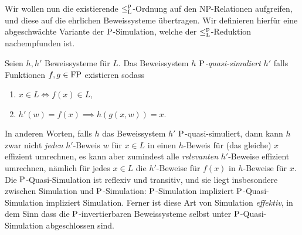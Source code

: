 Wir wollen nun die existierende $\leqlp$-Ordnung auf den NP-Relationen aufgreifen, und diese auf die ehrlichen Beweissysteme übertragen. Wir definieren hierfür eine abgeschwächte Variante der $\P$-Simulation, welche der $\leqlp$-Reduktion nachempfunden ist.
\begin{definition}
    Seien $h,h'$ Beweissysteme für $L$. Das Beweissystem $h$ \emph{$\P$-quasi-simuliert} $h'$ falls Funktionen $f,g\in\FP$ existieren sodass
    \begin{enumerate}
        \item $x\in L \iff f(x)\in L$,
        \item $ h'(w)=f(x) \implies h(g(x, w)) = x. $\qedhere
    \end{enumerate}
\end{definition}
In anderen Worten, falls $h$ das Beweissystem $h'$ $\P$-quasi-simuliert, dann kann $h$ zwar nicht \emph{jeden} $h'$-Beweis $w$ für $x\in L$ in einen $h$-Beweis für (das gleiche) $x$ effizient umrechnen, es kann aber zumindest alle \emph{relevanten} $h'$-Beweise effizient umrechnen, nämlich für jedes $x\in L$ die $h'$-Beweise für $f(x)$ in $h$-Beweise für $x$.
Die $\P$-Quasi-Simulation ist reflexiv und transitiv, und sie 
liegt insbesondere zwischen Simulation und $\P$-Simulation: $\P$-Simulation impliziert $\P$-Quasi-Simulation impliziert Simulation.
Ferner ist diese Art von Simulation \emph{effektiv}, in dem Sinn dass die $\P$-invertierbaren Beweissysteme selbst unter $\P$-Quasi-Simulation abgeschlossen sind.


